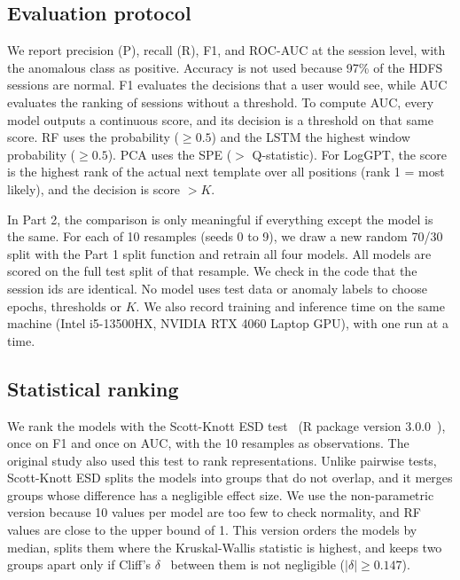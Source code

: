 \documentclass[10pt, conference]{IEEEtran}
\begin{document}
\subsection{Evaluation protocol}

We report precision (P), recall (R), F1, and ROC-AUC at the session level, with the anomalous class as positive. Accuracy is not used because 97\% of the HDFS sessions are normal. F1 evaluates the decisions that a user would see, while AUC evaluates the ranking of sessions without a threshold. To compute AUC, every model outputs a continuous score, and its decision is a threshold on that same score. RF uses the probability ($\geq 0.5$) and the LSTM the highest window probability ($\geq 0.5$). PCA uses the SPE ($>$ Q-statistic). For LogGPT, the score is the highest rank of the actual next template over all positions (rank 1 = most likely), and the decision is score $> K$.

In Part 2, the comparison is only meaningful if everything except the model is the same. For each of 10 resamples (seeds 0 to 9), we draw a new random 70/30 split with the Part 1 split function and retrain all four models. All models are scored on the full test split of that resample. We check in the code that the session ids are identical. No model uses test data or anomaly labels to choose epochs, thresholds or $K$. We also record training and inference time on the same machine (Intel i5-13500HX, NVIDIA RTX 4060 Laptop GPU), with one run at a time.

\subsection{Statistical ranking}

We rank the models with the Scott-Knott ESD test~\cite{tantithamthavorn2017empirical} (R package version 3.0.0~\cite{scottknottesd}), once on F1 and once on AUC, with the 10 resamples as observations. The original study also used this test to rank representations. Unlike pairwise tests, Scott-Knott ESD splits the models into groups that do not overlap, and it merges groups whose difference has a negligible effect size. We use the non-parametric version because 10 values per model are too few to check normality, and RF values are close to the upper bound of 1. This version orders the models by median, splits them where the Kruskal-Wallis statistic is highest, and keeps two groups apart only if Cliff's $\delta$~\cite{cliff1993dominance} between them is not negligible ($|\delta| \geq 0.147$).
\end{document}

